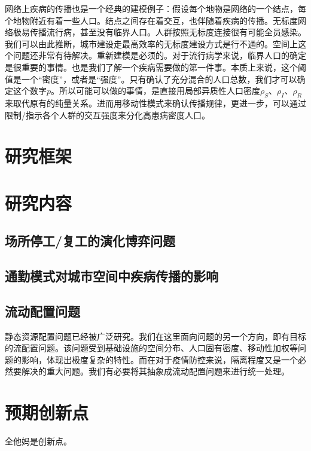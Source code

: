 网络上疾病的传播也是一个经典的建模例子：假设每个地物是网络的一个结点，每个地物附近有着一些人口。结点之间存在着交互，也伴随着疾病的传播。无标度网络极易传播流行病，甚至没有临界人口。人群按照无标度连接很有可能全员感染。我们可以由此推断，城市建设走最高效率的无标度建设方式是行不通的。空间上这个问题还非常有待解决。重新建模是必须的。对于流行病学来说，临界人口的确定是很重要的事情。也是我们了解一个疾病需要做的第一件事。本质上来说，这个阈值是一个“密度”，或者是“强度”。只有确认了充分混合的人口总数，我们才可以确定这个数字$p$。所以可能可以做的事情，是直接用局部异质性人口密度$\rho_S$、$\rho_I$、$\rho_R$来取代原有的纯量关系。进而用移动性模式来确认传播规律，更进一步，可以通过限制/指示各个人群的交互强度来分化高患病密度人口。



\section{研究框架}



\section{研究内容}

\subsection{场所停工/复工的演化博弈问题}



\subsection{通勤模式对城市空间中疾病传播的影响}

\subsection{流动配置问题}

静态资源配置问题已经被广泛研究。我们在这里面向问题的另一个方向，即有目标的流配置问题。该问题受到基础设施的空间分布、人口固有密度、移动性加权等问题的影响，体现出极度复杂的特性。而在对于疫情防控来说，隔离程度又是一个必然要解决的重大问题。我们有必要将其抽象成流动配置问题来进行统一处理。

\section{预期创新点}
全他妈是创新点。